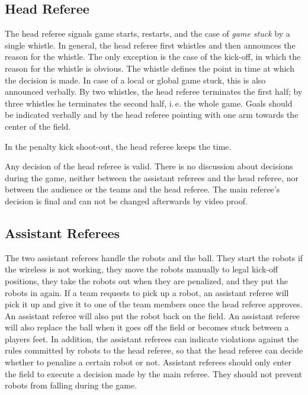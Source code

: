 \documentclass[12pt]{article}
\newcommand{\ie}{\mbox{i.\,e.}\xspace}
\begin{document}
\subsection{Head Referee}
\label{sec:head_referee}
The head referee signals game starts, restarts, and the case of \emph{game stuck} by a single whistle. In general, the head referee first whistles and then announces the reason for the whistle. The only exception is the case of the kick-off, in which the reason for the whistle is obvious. The whistle defines the point in time at which the decision is made. In case of a local or global game stuck, this is also announced verbally. By two whistles, the head referee terminates the first half; by three whistles he terminates the second half, \ie the whole game.  Goals should be indicated verbally and by the head referee pointing with one arm towards the center of the field.

In the penalty kick shoot-out, the head referee keeps the time.

Any decision of the head referee is valid. There is no discussion about decisions during the game, neither between the assistant referees and the head referee, nor between the audience or the teams and the head referee. The main referee's decision is final and can not be changed afterwards by video proof.

\subsection{Assistant Referees}
\label{sec:assist_referee}
The two assistant referees handle the robots and the ball. They start the robots if the wireless is not working, they move the robots manually to legal kick-off positions, they take the robots out when they are penalized, and they put the robots in again. If a team requests to pick up a robot, an assistant referee will pick it up and give it to one of the team members once the head referee approves. An assistant referee will also put the robot back on the field. An assistant referee will also replace the ball when it goes off the field or becomes stuck between a players feet.  In addition, the assistant referees can indicate violations against the rules committed by robots to the head referee, so that the head referee can decide whether to penalize a certain robot or not. Assistant referees should only enter the field to execute a decision made by the main referee. They should not prevent robots from falling during the game.
\end{document}
